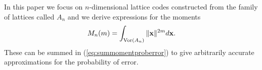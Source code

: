\documentclass[journal]{IEEEtran}
\begin{document}
\newcommand{\calM}{M}
In this paper we focus on $n$-dimensional lattice codes constructed from the family of lattices called $A_n$ and we derive expressions for the moments
\[
 \calM_n(m) = \int_{\vor(A_n)} \|\xbf\|^{2m} d\xbf.
\]
These can be summed in (\ref{eq:summomentproberror}) to give arbitrarily accurate approximations for the probability of error.






\end{document}
